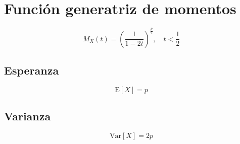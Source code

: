 \documentclass[a4paper, 10pt]{article} %
\begin{document}
\section{Función generatriz de momentos}
$$M_X(t)=\left(\frac 1 {1 - 2t}\right)^{\frac p 2},\quad t<\frac 1 2$$

\subsection{Esperanza}
$$\mathrm E[X]=p$$

\subsection{Varianza}
$$\mathrm{Var}[X]=2p$$
\end{document}
